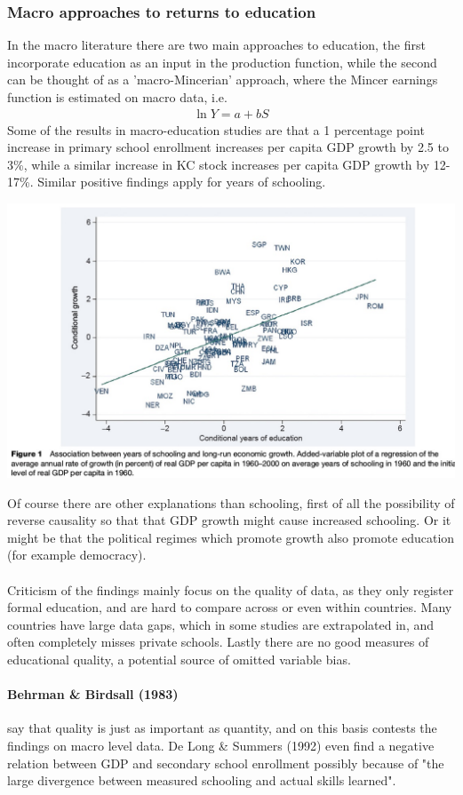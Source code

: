 \documentclass[12pt, a4paper]{article}
\begin{document}
\begin{multicols}{2}
\subsubsection{Macro approaches to returns to education}
In the macro literature there are two main approaches to education, the first incorporate education as an input in the production function, while the second can be thought of as a 'macro-Mincerian' approach, where the Mincer earnings function is estimated on macro data, i.e.
\begin{align*}
\ln Y = a + b S
\end{align*}
Some of the results in macro-education studies are that a 1 percentage point increase in primary school enrollment increases per capita GDP growth by 2.5 to 3\%, while a similar increase in KC stock increases per capita GDP growth by 12-17\%. Similar positive findings apply for years of schooling.

\includegraphics[width = 0.45 \textwidth]{plothanus.jpg}

Of course there are other explanations than schooling, first of all the possibility of reverse causality so that that GDP growth might cause increased schooling. Or it might be that the political regimes which promote growth also promote education (for example democracy).
\\ \\
Criticism of the findings mainly focus on the quality of data, as they only register formal education, and are hard to compare across or even within countries. Many countries have large data gaps, which in some studies are extrapolated in, and often completely misses private schools. Lastly there are no good measures of educational quality, a potential source of omitted variable bias.

\paragraph{Behrman \& Birdsall (1983)} say that quality is just as important as quantity, and on this basis contests the findings on macro level data. De Long \& Summers (1992) even find a negative relation between GDP and secondary school enrollment possibly because of "the large divergence between measured schooling and actual skills learned".


\end{multicols}
\end{document}
